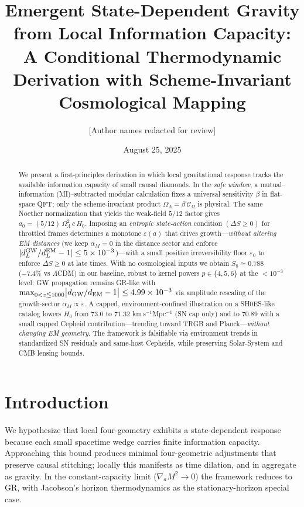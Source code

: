 \documentclass[aps,prd,onecolumn,notitlepage,superscriptaddress,nofootinbib]{revtex4-2}
\newcommand{\COmega}{\mathcal{C}_{\Omega}}
\newcommand{\OL}{\Omega_{\Lambda}}
\newcommand{\aN}{a_0}
\newcommand{\alpham}{\alpha_M}
\newcommand{\Hzero}{H_0}
\newcommand{\eps}{\varepsilon}
\begin{document}
\title{Emergent State-Dependent Gravity from Local Information Capacity:\\
A Conditional Thermodynamic Derivation with Scheme-Invariant Cosmological Mapping}

\author{[Author names redacted for review]}
\date{August 25, 2025}

\begin{abstract}
We present a first-principles derivation in which local gravitational response tracks the available information capacity of small causal diamonds. In the \emph{safe window}, a mutual–information (MI)–subtracted modular calculation fixes a universal sensitivity \(\beta\) in flat-space QFT; only the scheme-invariant product \(\OL=\beta\,\COmega\) is physical. The same Noether normalization that yields the weak-field \(5/12\) factor gives \(\aN=(5/12)\,\OL^2\,c\,\Hzero\). Imposing an \emph{entropic state-action} condition \((\Delta S\ge 0)\) for throttled frames determines a monotone \(\eps(a)\) that drives growth—\emph{without altering EM distances} (we keep \(\alpham=0\) in the distance sector and enforce \(|d_L^{\rm GW}/d_L^{\rm EM}-1|\le 5\times 10^{-3}\))—with a small positive irreversibility floor \(\eps_0\) to enforce \(\Delta S\ge0\) at late times. With no cosmological inputs we obtain \(S_8\simeq 0.788\) (−7.4\% vs \(\Lambda\)CDM) in our baseline, robust to kernel powers \(p\in\{4,5,6\}\) at the \(<10^{-3}\) level; GW propagation remains GR-like with \(\max_{0<z\lesssim 1000}\!\big|d_{\rm GW}/d_{\rm EM}-1\big|\le 4.99\times 10^{-3}\) via amplitude rescaling of the growth-sector \(\alpham\propto \eps\). A capped, environment-confined illustration on a SH0ES-like catalog lowers \(\Hzero\) from \(73.0\) to \(71.32\) km\,s\(^{-1}\)Mpc\(^{-1}\) (SN cap only) and to \(70.89\) with a small capped Cepheid contribution—trending toward TRGB and Planck—\emph{without changing EM geometry}. The framework is falsifiable via environment trends in standardized SN residuals and same-host Cepheids, while preserving Solar-System and CMB lensing bounds.
\end{abstract}

\maketitle

\section{Introduction}
We hypothesize that local four-geometry exhibits a state-dependent response because each small spacetime wedge carries finite information capacity. Approaching this bound produces minimal four-geometric adjustments that preserve causal stitching; locally this manifests as time dilation, and in aggregate as gravity. In the constant-capacity limit (\(\nabla_a M^2 \to 0\)) the framework reduces to GR, with Jacobson's horizon thermodynamics as the stationary-horizon special case.
\end{document}
